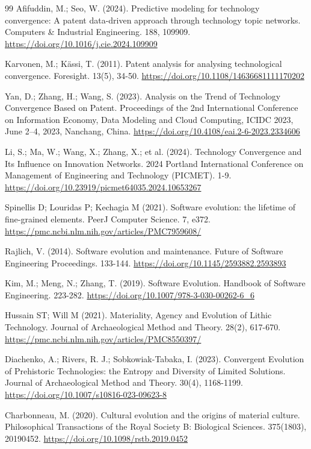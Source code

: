 \documentclass[11pt]{article}
\begin{document}
\begin{thebibliography}{99}
Afifuddin, M.; Seo, W. (2024). Predictive modeling for technology convergence: A patent data-driven approach through technology topic networks. Computers \& Industrial Engineering. 188, 109909. \url{https://doi.org/10.1016/j.cie.2024.109909}

Karvonen, M.; Kässi, T. (2011). Patent analysis for analysing technological convergence. Foresight. 13(5), 34-50. \url{https://doi.org/10.1108/14636681111170202}

Yan, D.; Zhang, H.; Wang, S. (2023). Analysis on the Trend of Technology Convergence Based on Patent. Proceedings of the 2nd International Conference on Information Economy, Data Modeling and Cloud Computing, ICIDC 2023, June 2--4, 2023, Nanchang, China. \url{https://doi.org/10.4108/eai.2-6-2023.2334606}

Li, S.; Ma, W.; Wang, X.; Zhang, X.; et al. (2024). Technology Convergence and Its Influence on Innovation Networks. 2024 Portland International Conference on Management of Engineering and Technology (PICMET). 1-9. \url{https://doi.org/10.23919/picmet64035.2024.10653267}

Spinellis D; Louridas P; Kechagia M (2021). Software evolution: the lifetime of fine-grained elements. PeerJ Computer Science. 7, e372. \url{https://pmc.ncbi.nlm.nih.gov/articles/PMC7959608/}

Rajlich, V. (2014). Software evolution and maintenance. Future of Software Engineering Proceedings. 133-144. \url{https://doi.org/10.1145/2593882.2593893}

Kim, M.; Meng, N.; Zhang, T. (2019). Software Evolution. Handbook of Software Engineering. 223-282. \url{https://doi.org/10.1007/978-3-030-00262-6\_6}

Hussain ST; Will M (2021). Materiality, Agency and Evolution of Lithic Technology. Journal of Archaeological Method and Theory. 28(2), 617-670. \url{https://pmc.ncbi.nlm.nih.gov/articles/PMC8550397/}

Diachenko, A.; Rivers, R. J.; Sobkowiak-Tabaka, I. (2023). Convergent Evolution of Prehistoric Technologies: the Entropy and Diversity of Limited Solutions. Journal of Archaeological Method and Theory. 30(4), 1168-1199. \url{https://doi.org/10.1007/s10816-023-09623-8}

Charbonneau, M. (2020). Cultural evolution and the origins of material culture. Philosophical Transactions of the Royal Society B: Biological Sciences. 375(1803), 20190452. \url{https://doi.org/10.1098/rstb.2019.0452}


\end{thebibliography}
\end{document}
